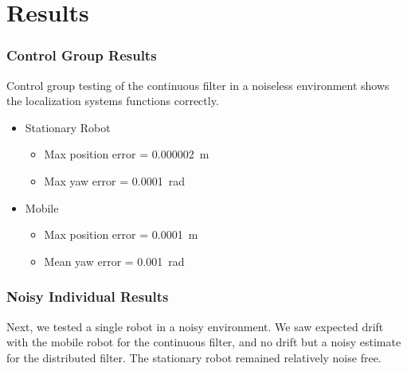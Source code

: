 \documentclass[14pt]{beamer}
\begin{document}
\section{Results}
\begin{frame}
\frametitle{Control Group Results}
Control group testing of the continuous filter in a noiseless environment shows the localization systems functions correctly.

\begin{itemize}
\item Stationary Robot
    \begin{itemize}
    \item Max position error = \SI{.000002}{\meter}
    \item Max yaw error = \SI{.0001}{\radian}
    \end{itemize}
\item Mobile
    \begin{itemize}
    \item Max position error = \SI{.0001}{\meter}
    \item Mean yaw error = \SI{.001}{\radian}
    \end{itemize}
\end{itemize}
\end{frame}

\begin{frame}
\frametitle{Noisy Individual Results}
Next, we tested a single robot in a noisy environment. We saw expected drift with the mobile robot for the continuous filter, and no drift but a noisy estimate for the distributed filter. The stationary robot remained relatively noise free.
\end{frame}
\end{document}
